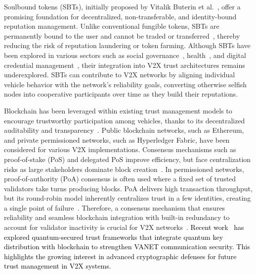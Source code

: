 \cite{cho2010survey}\documentclass[journal,comsoc,twoside]{IEEEtran}
\begin{document}
Soulbound tokens (SBTs), initially proposed by Vitalik Buterin et al.~\cite{Buterin}, offer a promising foundation for decentralized, non-transferable, and identity-bound reputation management. Unlike conventional fungible tokens, SBTs are permanently bound to the user and cannot be traded or transferred~\cite{shashidhara}, thereby reducing the risk of reputation laundering or token farming. Although SBTs have been explored in various sectors such as social governance~\cite{ichihara}, health~\cite{Lunesu}, and digital credential management~\cite{pericas}, their integration into V2X trust architectures remains underexplored. SBTs can contribute to V2X networks by aligning individual vehicle behavior with the network’s reliability goals, converting otherwise selfish nodes into cooperative participants over time as they build their reputations.

Blockchain has been leveraged within existing trust management models to encourage trustworthy participation among vehicles, thanks to its decentralized auditability and transparency~\cite{sehar}. Public blockchain networks, such as Ethereum, and private permissioned networks, such as Hyperledger Fabric, have been considered for various V2X implementations. Consensus mechanisms such as proof-of-stake (PoS) and delegated PoS improve efficiency, but face centralization risks as large stakeholders dominate block creation~\cite{hussein}. In permissioned networks, proof-of-authority (PoA) consensus is often used where a fixed set of trusted validators take turns producing blocks. PoA delivers high transaction throughput, but its round-robin model inherently centralizes trust in a few identities, creating a single point of failure~\cite{chen}. Therefore, a consensus mechanism that ensures reliability and seamless blockchain integration with built-in redundancy to account for validator inactivity is crucial for V2X networks~\cite{HopeJournal}. \textcolor{black}{Recent work~\cite{awan2025qstmf} has explored quantum-secured trust frameworks that integrate quantum key distribution with blockchain to strengthen VANET communication security. This highlights the growing interest in advanced cryptographic defenses for future trust management in V2X systems.}
\end{document}

